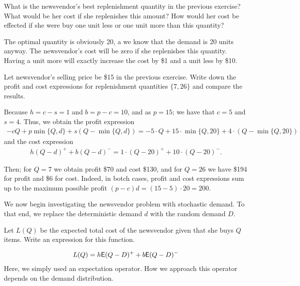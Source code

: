\begin{question}
What is the newsvendor's best replenishment quantity in the previous exercise? What would be her cost if she replenishes this amount? How would her cost be effected if she were buy one unit less or one unit more than this quantity?
\end{question}

\begin{solution}
The optimal quantity is obviously 20, a we know that the demand is 20 units anyway. The newsvendor's cost will be zero if she replenishes this quantity. Having a unit more will exactly increase the cost by \$1 and a unit less by \$10.
\end{solution}

\begin{question}
Let newsvendor's selling price be \$15 in the previous exercise. Write down the profit and cost expressions for replenishment quantities $\{7,26\}$ and compare the results.
\end{question}

\begin{solution}
Because $h=c-s=1$ and $b=p-c=10$, and as $p=15$; we have that $c=5$ and $s=4$. Thus, we obtain the profit expression
\begin{align*}
-cQ + p\min\{Q,d\} + s(Q-\min\{Q,d\}) = -5\cdot Q + 15\cdot\min\{Q,20\} + 4\cdot(Q-\min\{Q,20\})
\end{align*}
and the cost expression
\begin{align*}
h(Q-d)^+ + b(Q-d)^- = 1\cdot (Q-20)^+ + 10\cdot(Q-20)^-.
\end{align*}

Then; for $Q=7$ we obtain profit \$70 and cost \$130, and for $Q=26$ we have \$194 for profit and \$6 for cost. Indeed, in botch cases, profit and cost expressions sum up to the maximum possible profit $(p-c)d=(15-5)\cdot 20=200$.
\end{solution}

We now begin investigating the newsvendor problem with stochastic demand. To that end, we replace the deterministic demand $d$ with the random demand $D$. 

\begin{question}
Let $L(Q)$ be the expected total cost of the newsvendor given that she buys $Q$ items. Write an expression for this function.
\end{question}

\begin{solution}
\begin{align*}
L(Q) = h\mathsf{E} (Q-D)^+ + b\mathsf{E} (Q-D)^-
\end{align*}
Here, we simply used an expectation operator. How we approach this operator depends on the demand distribution. 
\end{solution}

